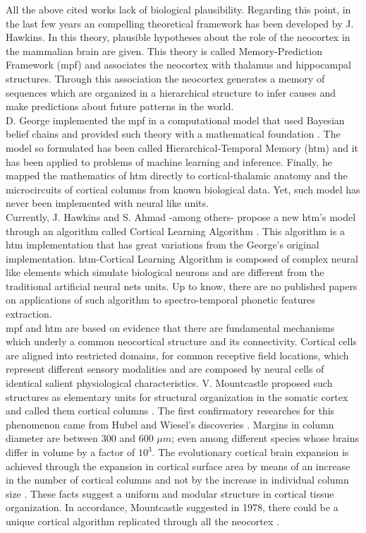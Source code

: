 \documentclass[11pt,a4paper]{article}
\begin{document}
All the above cited works lack of biological plausibility.
Regarding this point, in the last few years an compelling
theoretical framework has been developed by J. Hawkins.
In this theory, plausible hypotheses about the role of
the neocortex in the mammalian brain are given.
This theory is called Memory-Prediction Framework (\ac{mpf}) \cite{hawkins04}
and associates the neocortex with thalamus and hippocampal structures.
Through this association the neocortex generates a memory of sequences which
are organized in a hierarchical structure to infer causes and make predictions
about future patterns in the world.\\

D. George implemented the \ac{mpf} in a computational model that used Bayesian belief
chains and provided such theory with a mathematical foundation \cite{george09}.
The model so formulated has been called Hierarchical-Temporal Memory (\ac{htm}) and
it has been applied to problems of machine learning and inference.
Finally, he mapped the mathematics of \ac{htm} directly
to cortical-thalamic anatomy and the microcircuits of cortical
columns from known biological data.
Yet, such model has never been implemented with neural like units.\\

Currently, J. Hawkins and S. Ahmad -among others- propose
a new \ac{htm}'s model through an algorithm called Cortical Learning Algorithm \cite{hawkins16}.
This algorithm is a \ac{htm} implementation that has great variations from the
George's original implementation.
\ac{htm}-Cortical Learning Algorithm is composed of complex neural like elements which
simulate biological neurons and are different from the traditional artificial neural nets units.
Up to know, there are no published papers on
applications of such algorithm to spectro-temporal phonetic features extraction.\\

\ac{mpf} and \ac{htm} are based on evidence
that there are fundamental mechanisms which underly a common neocortical
structure and its connectivity.
Cortical cells are aligned into restricted domains, for common receptive field locations,
which represent different sensory modalities and are composed by neural cells of identical
salient physiological characteristics.
V. Mountcastle proposed such structures as elementary units for structural organization
in the somatic cortex and called them cortical columns \cite{mountcastle55, mountcastle57}.
The first confirmatory researches for this phenomenon came from Hubel and Wiesel’s
discoveries \cite{hubel62, hubel68}.
Margins in column diameter are between 300 and 600 $\mu m$; even
among different species whose brains differ in volume by a factor of $10^3$.
The evolutionary cortical brain expansion is achieved through the expansion in
cortical surface area by means of an increase in the number of cortical columns
and not by the increase in individual column size \cite{rakic95}.
These facts suggest a uniform and modular structure in cortical tissue organization.
In accordance, Mountcastle suggested in 1978, there could be
a unique cortical algorithm replicated through all the neocortex
\cite{mountcastle78}.\\
\end{document}
